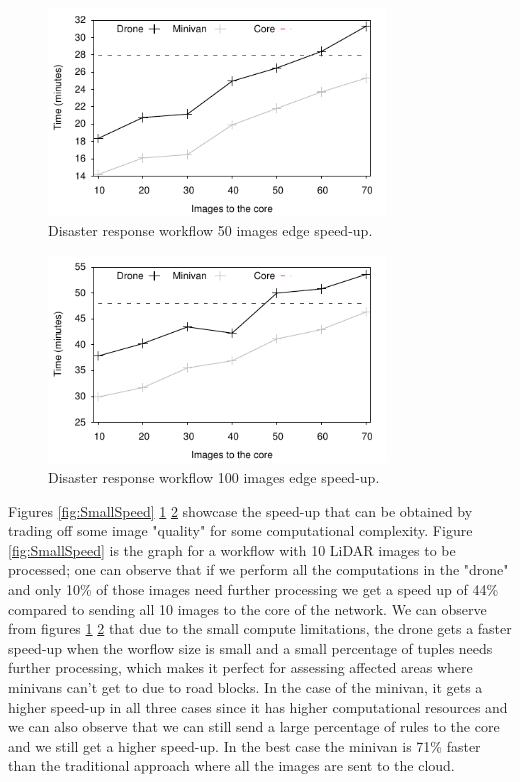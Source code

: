 \begin{figure}[h]
  \centering
  \includegraphics[width=0.8\textwidth]{Results/MediumSpeed}
  \caption{Disaster response workflow 50 images edge speed-up.}
  \label{fig:MediumSpeed}
\end{figure}

\begin{figure}[h]
  \centering
  \includegraphics[width=0.8\textwidth]{Results/BigSpeed}
  \caption{Disaster response workflow 100 images edge speed-up.}
  \label{fig:BigSpeed}
\end{figure}

Figures \ref{fig:SmallSpeed} \ref{fig:MediumSpeed} \ref{fig:BigSpeed} showcase the speed-up that can be obtained by trading off some image "quality" for some computational complexity. Figure \ref{fig:SmallSpeed} is the graph for a workflow with 10 LiDAR images to be processed; one can observe that if we perform all the computations in the "drone" and only 10\% of those images need further processing we get a speed up of 44\% compared to sending all 10 images to the core of the network. We can observe from figures \ref{fig:MediumSpeed} \ref{fig:BigSpeed} that due to the small compute limitations, the drone gets a faster speed-up when the worflow size is small and a small percentage of tuples needs further processing, which makes it perfect for assessing affected areas where minivans can't get to due to road blocks. In the case of the minivan, it gets a higher speed-up in all three cases since it has higher computational resources and we can also observe that we can still send a large percentage of rules to the core and we still get a higher speed-up. In the best case the minivan is 71\% faster than the traditional approach where all the images are sent to the cloud.

